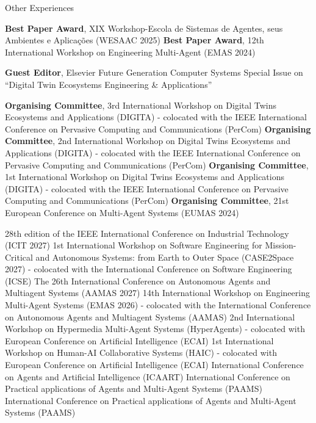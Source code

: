 \setPrefix{\faTrophy}
\begin{rubric}{Other Experiences}

\entry*[2025] \textbf{Best Paper Award}, XIX Workshop-Escola de Sistemas de Agentes, seus Ambientes e Aplicações (WESAAC 2025)
\entry*[2024] \textbf{Best Paper Award}, 12th International Workshop on Engineering Multi-Agent (EMAS 2024)

\setPrefix{\faBalanceScale}
\entry*[2025] \textbf{Guest Editor}, Elsevier Future Generation Computer Systems Special Issue on ``Digital Twin Ecosystems Engineering \& Applications''

\setPrefix{\faBullhorn}
\entry*[2027] \textbf{Organising Committee}, 3rd International Workshop on Digital Twins Ecosystems and Applications (DIGITA) - colocated with the IEEE International Conference on Pervasive Computing and Communications (PerCom)
\entry*[2026] \textbf{Organising Committee}, 2nd International Workshop on Digital Twins Ecosystems and Applications (DIGITA) - colocated with the IEEE International Conference on Pervasive Computing and Communications (PerCom)
\entry*[2025] \textbf{Organising Committee}, 1st International Workshop on Digital Twins Ecosystems and Applications (DIGITA) - colocated with the IEEE International Conference on Pervasive Computing and Communications (PerCom)
\entry*[2024] \textbf{Organising Committee}, 21st European Conference on Multi-Agent Systems (EUMAS 2024) 

\setPrefix{\faUsers}
\entry*[2027] 28th edition of the IEEE International Conference on Industrial Technology (ICIT 2027)
\entry*[2027] 1st International Workshop on Software Engineering for Mission-Critical and Autonomous Systems: from Earth to Outer Space (CASE2Space 2027) - colocated with the International Conference on Software Engineering (ICSE)
\entry*[2027] The 26th International Conference on Autonomous Agents and Multiagent Systems (AAMAS 2027)
\entry*[2026] 14th International Workshop on Engineering Multi-Agent Systems (EMAS 2026) - colocated with the International Conference on Autonomous Agents and Multiagent Systems (AAMAS)
\entry*[2025] 2nd International Workshop on Hypermedia Multi-Agent Systems (HyperAgents) - colocated with European Conference on Artificial Intelligence (ECAI)
\entry*[2025] 1st International Workshop on Human-AI Collaborative Systems (HAIC) - colocated with European Conference on Artificial Intelligence (ECAI)
\entry*[2025] International Conference on Agents and Artificial Intelligence (ICAART)
\entry*[2025] International Conference on Practical applications of Agents and Multi-Agent Systems (PAAMS)
\entry*[2024] International Conference on Practical applications of Agents and Multi-Agent Systems (PAAMS)



\end{rubric}
